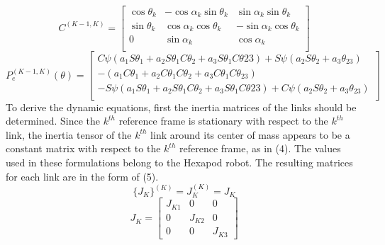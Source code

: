 \begin{equation}
C^{(K-1,K)} =
\begin{bmatrix}
\cos\theta_k &-\cos\alpha_k\sin\theta_k &\sin\alpha_k\sin\theta_k \\
\sin\theta_k &\cos\alpha_k\cos\theta_k &-\sin\alpha_k\cos\theta_k \\
0 &\sin\alpha_k &\cos\alpha_k \\ 
\end{bmatrix}
\end{equation}
\begin{equation}
P_e^{(K-1,K)} (\theta) =
\begin{bmatrix}
C\psi(a_1S\theta_1+a_2S\theta_1C\theta_2+a_3S\theta_1C\theta{23})+S\psi(a_2S\theta_2+a_3\theta_{23}) \\
-(a_1C\theta_1+a_2C\theta_1C\theta_2+a_3C\theta_1C\theta_{23})  \\
-S\psi(a_1S\theta_1+a_2S\theta_1C\theta_2+a_3S\theta_1C\theta{23})+C\psi(a_2S\theta_2+a_3\theta_{23}) \\
\end{bmatrix}
\end{equation}
To derive the dynamic equations, first the inertia matrices of the links should be determined. Since the $k^{th}$ reference frame is stationary with respect to the $k^{th}$ link, the inertia tensor of the $k^{th}$ link around its center of mass appears to be a constant matrix with respect to the $k^{th}$ reference frame, as in (4). The values used in these formulations belong to the Hexapod robot. The resulting matrices for each link are in the form of (5).
\begin{equation}
\{J_K\}^{(K)} = J_K^{(K)} = J_K
\end{equation}
\begin{equation}
J_K = \begin{bmatrix}
J_{K1} & 0      & 0 \\
0      & J_{K2} & 0 	\\
0      & 0      & J_{K3} 
\end{bmatrix}
\end{equation}

